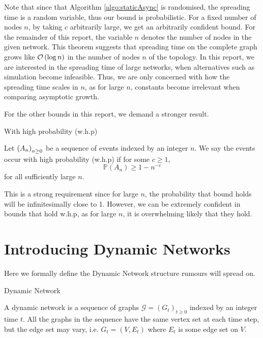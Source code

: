 Note that since that Algorithm \ref{algo:staticAsync} is randomised, the spreading time is a random variable, thus our bound is probabilistic. 
For a fixed number of nodes $n$, by taking $c$ arbitrarily large, we get an arbitrarily confident bound. %
For the remainder of this report, the variable $n$ denotes the number of nodes in the given network.
This theorem suggests that spreading time on the complete graph grows like 
$
	\mathcal{O} \left( \log n \right)
$
in the number of nodes $n$ of the topology. In this report, we are interested in the spreading time of large networks, when alternatives such as simulation become infeasible. Thus, we are only concerned with how the spreading time scales in $n$, as for large $n$, constants become irrelevant when comparing asymptotic growth.

For the other bounds in this report, we demand a stronger result.

\begin{definition}
	With high probability (w.h.p)

	\noindent
	Let $\left( A_n \right)_{n \geq 0}$ be a sequence of events indexed by an integer $n$. We say the events occur with high probability (w.h.p) if for some $c \geq 1$, 
	$$
		\mathbb{P}(A_n) \geq 1 - n^{-c}
	$$ for all sufficiently large $n$.
\end{definition}

This is a strong requirement since for large $n$, the probability that bound holds will be infinitesimally close to 1. However, we can be extremely confident in bounds that hold w.h.p, as for large $n$, it is overwhelming likely that they hold.


\section{Introducing Dynamic Networks}

Here we formally define the Dynamic Network structure rumours will spread on.

\begin{definition}
	Dynamic Network

	\noindent
	A dynamic network is a sequence of graphs $\mathcal{G} = (G_t)_{t \geq 0}$ indexed by an integer time $t$. All the graphs in the sequence have the same vertex set at each time step, but the edge set may vary, i.e.  $G_t = (V, E_t)$ where $E_t$ is some edge set on $V$.
\end{definition}


